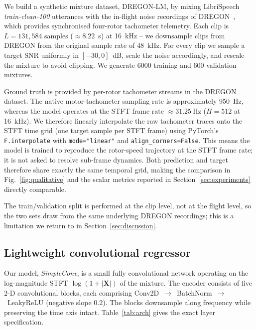 \documentclass{QD_2026}
\begin{document}
We build a synthetic mixture dataset, DREGON-LM, by mixing
LibriSpeech~ \emph{train-clean-100} utterances
with the in-flight noise recordings of DREGON~, which
provides synchronised four-rotor tachometer telemetry.
Each clip is $L = 131{,}584$ samples ($\approx 8.22$~s) at \SI{16}{\kilo\hertz} -- we downsample clips from DREGON from the original sample rate of \SI{48}{\kilo\hertz}.
For every clip we sample a target SNR uniformly in $[-30, 0]$~dB, scale the
noise accordingly, and rescale the mixture to avoid clipping.
We generate $6000$ training and $600$ validation mixtures.

Ground truth is provided by per-rotor tachometer streams in the DREGON dataset.
The native motor-tachometer sampling rate is approximately \SI{950}{\hertz},
whereas the model operates at the STFT frame rate
$\approx \SI{31.25}{\hertz}$ ($H = 512$ at \SI{16}{\kilo\hertz}).
We therefore linearly interpolate the raw tachometer traces onto the STFT time
grid (one target sample per STFT frame) using PyTorch's
\texttt{F.interpolate} with \texttt{mode="linear"} and
\texttt{align\_corners=False}.
This means the model is trained to reproduce the rotor-speed trajectory at the
STFT frame rate; it is not asked to resolve sub-frame dynamics.
Both prediction and target therefore share exactly the same temporal grid,
making the comparison in Fig.~\ref{fig:qualitative} and the scalar metrics
reported in Section~\ref{sec:experiments} directly comparable.

The train/validation split is performed at the clip level, not at the flight
level, so the two sets draw from the same underlying DREGON recordings; this
is a limitation we return to in Section~\ref{sec:discussion}.

\subsection{Lightweight convolutional regressor}
\label{sec:simpleconv}

Our model, \emph{SimpleConv}, is a small fully convolutional network
operating on the log-magnitude STFT $\log(1 + |\mathbf{X}|)$ of the mixture.
The encoder consists of five $2$-D convolutional blocks, each comprising
Conv2D~$\to$~BatchNorm~$\to$~LeakyReLU (negative slope $0.2$).
The blocks downsample along frequency while preserving the time axis intact.
Table~\ref{tab:arch} gives the exact layer specification.
\end{document}
